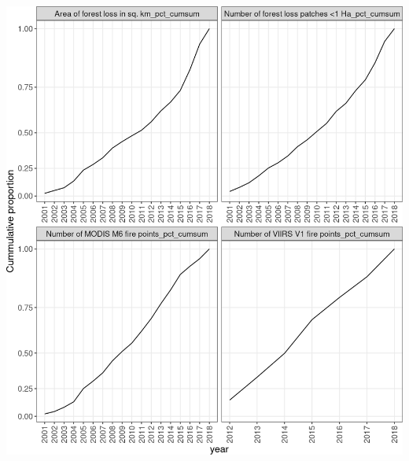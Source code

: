 \documentclass[10pt,landscape,a3paper]{article}
\begin{document}
\begin{center}\includegraphics{img/modelling/aa-eda-ts-3} \end{center}
\end{document}
